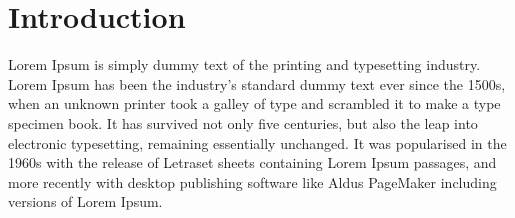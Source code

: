 \documentclass[11pt,a4paper]{report}
\begin{document}
\setcounter{page}{1}

%
%
%



%



\newpage
\setcounter{page}{1}


%

\chapter{Introduction}

Lorem Ipsum is simply dummy text of the printing and typesetting industry. Lorem Ipsum has been the industry's standard dummy text ever since the 1500s, when an unknown printer took a galley of type and scrambled it to make a type specimen book. It has survived not only five centuries, but also the leap into electronic typesetting, remaining essentially unchanged. It was popularised in the 1960s with the release of Letraset sheets containing Lorem Ipsum passages, and more recently with desktop publishing software like Aldus PageMaker including versions of Lorem Ipsum.
\end{document}
